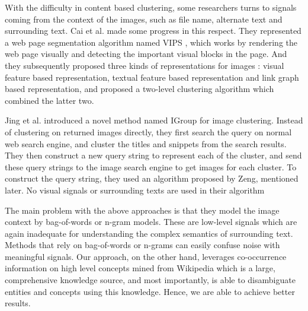With the difficulty in content based clustering,
some researchers turns to signals coming from the context of the images,
such as file name, alternate text and surrounding text.
Cai et al. made some progress in this respect.
They represented a web page segmentation algorithm named VIPS \cite{VIPS},
which works by rendering the web page visually and detecting
the important visual blocks in the page. And they subsequently proposed three
kinds of representations for images \cite{Cai2004}:
visual feature based representation, textual feature based representation and
link graph based representation, and proposed a two-level clustering algorithm
which combined the latter two.

Jing et al. \cite{Jing2006} introduced a novel method named IGroup for image clustering.
Instead of clustering on returned images directly, they first search the query
on normal web search engine, and cluster the titles and snippets from the search results.
They then construct a new query string to represent each of the cluster, and
send these query strings to the image search engine to get images for each
cluster. To construct the query string, they used an algorithm
proposed by Zeng\cite{Zeng2004}, mentioned later.
No visual signals or surrounding texts are used in their algorithm

The main problem with the above approaches is that they model the image context
by bag-of-words or n-gram models. These are low-level signals which are again
inadequate for understanding the complex semantics of surrounding text. Methods
that rely on bag-of-words or n-grams can easily confuse noise with meaningful
signals. Our approach, on the other hand, leverages co-occurrence information on
high level concepts mined from Wikipedia which is a large,
comprehensive knowledge source, and most importantly,
is able to disambiguate entities and concepts using
this knowledge. Hence, we are able to achieve better results.


